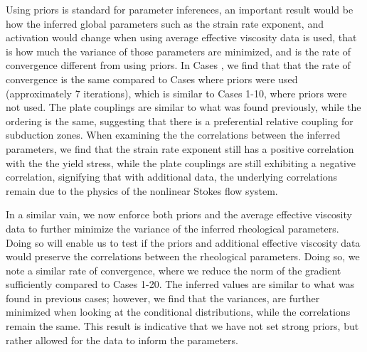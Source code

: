 \documentclass[12pt]{article}
\begin{document}
{Using priors is standard for parameter inferences, an important result would be how the inferred global parameters such as the strain rate exponent, and activation would change when using average effective viscosity data is used, that is how much the variance of those parameters are minimized, and is the rate of convergence different from using priors. In Cases  , we find that that the rate of convergence is the same compared to Cases where priors were used (approximately 7 iterations), which is similar to Cases 1-10, where priors were not used. The plate couplings are similar to what was found previously, while the ordering is the same, suggesting that there is a preferential relative coupling for subduction zones. When examining the the correlations between the inferred parameters, we find that the strain rate exponent still has a positive correlation with the the yield stress, while the plate couplings are still exhibiting a negative correlation, signifying that with additional data, the underlying correlations remain due to the physics of the nonlinear Stokes flow system. 

In a similar vain, we now enforce both priors and the average effective viscosity data to further minimize the variance of the inferred rheological parameters. Doing so will enable us to test if the priors and additional effective viscosity data would preserve the correlations between the rheological parameters. Doing so, we note a similar rate of convergence, where we reduce the norm of the gradient sufficiently compared to Cases 1-20. The inferred values are similar to what was found in previous cases; however, we find that the variances, are further minimized when looking at the conditional distributions, while the correlations remain the same. This result is indicative that we have not set strong priors, but rather allowed for the data to inform the parameters. 

}
\end{document}
